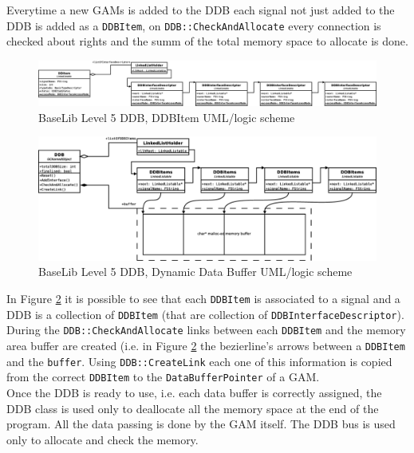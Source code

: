 Everytime a new GAMs is added to the DDB each signal not just added to the DDB is added as a \texttt{DDBItem}, on \texttt{DDB::CheckAndAllocate} every connection is checked about rights and the summ of the total memory space to allocate is done.

\begin{figure}[h!]
 \begin{center}
  \includegraphics[width=\textwidth]{level5/DDBItem_logic.eps}
  \caption{BaseLib Level 5 DDB, DDBItem UML/logic scheme}
  \label{f:level5:DDB:DDBItem_logic}
 \end{center}
\end{figure}
\begin{figure}[h!]
 \begin{center}
  \includegraphics[width=\textwidth]{level5/DDB_logic.eps}
  \caption{BaseLib Level 5 DDB, Dynamic Data Buffer UML/logic scheme}
  \label{f:level5:DDB:DDB_logic}
 \end{center}
\end{figure}

In Figure \ref{f:level5:DDB:DDB_logic} it is possible to see that each \texttt{DDBItem} is associated to a signal and a DDB is a collection of \texttt{DDBItem} (that are collection of \texttt{DDBInterfaceDescriptor}). During the \texttt{DDB::CheckAndAllocate} links between each \texttt{DDBItem} and the memory area buffer are created (i.e. in Figure \ref{f:level5:DDB:DDB_logic} the bezierline's arrows between a \texttt{DDBItem} and the \texttt{buffer}.
Using \texttt{DDB::CreateLink} each one of this information is copied from the correct \texttt{DDBItem} to the \texttt{DataBufferPointer} of a GAM. \\


Once the DDB is ready to use, i.e. each data buffer is correctly assigned, the DDB class is used only to deallocate all the memory space at the end of the program. All the data passing is done by the GAM itself. The DDB bus is used only to allocate and check the memory. \\


